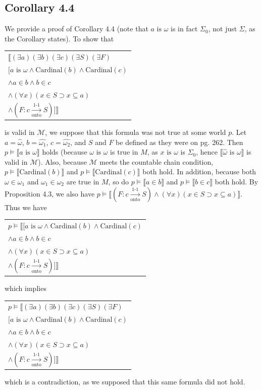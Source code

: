 \documentclass{article}
\newcommand{\lbc}{\llbracket}
\newcommand{\rbc}{\rrbracket}
\theoremstyle{definition}
\begin{document}
\subsection*{Corollary 4.4}
We provide a proof of Corollary 4.4 (note that $a\textrm{ is }\omega$ is in fact $\Sigma_0$, not just 
$\Sigma$, as the Corollary states). To show that 
\begin{center}
\begin{tabular}{l}
$\lbc(\exists a)(\exists b)(\exists c)(\exists S)(\exists F)$ \\
$[a\textrm{ is }\omega\wedge\textrm{Cardinal}(b)\wedge\textrm{Cardinal}(c)$ \\
$\wedge a\in b\wedge b\in c$ \\
$\wedge(\forall x)(x\in S\supset x\subseteq a)$ \\
$\wedge(F:c\xrightarrow[\textrm{onto}]{\text{1-1}} S)]\rbc$
\end{tabular}
\end{center}
is valid in $\mathcal{M}$, we suppose that this formula was not true at some world $p$. Let 
$a=\hat{\omega}$, $b=\widehat{\omega_1}$, $c=\widehat{\omega_2}$, and 
$S$ and $F$ be defined as they were on pg. 262. Then 
$p\vDash\lbc a\textrm{ is }\omega\rbc$ holds (because 
$\omega\textrm{ is }\omega$ is true in $M$, as $x\textrm{ is }\omega$ is $\Sigma_0$,
hence $\lbc\hat{\omega}\textrm{ is }\omega\rbc$ is 
valid in $\mathcal{M}$). Also, because $\mathcal{M}$ meets the countable chain condition, 
$p\vDash\lbc\textrm{Cardinal}(b)\rbc$ and $p\vDash\lbc\textrm{Cardinal}(c)\rbc$ both hold.
In addition, because both $\omega\in\omega_1$ and $\omega_1\in\omega_2$ are true in $M$, 
so do $p\vDash\lbc a\in b\rbc$ and $p\vDash\lbc b\in c\rbc$ both hold. By Proposition 4.3, we 
also have $p\vDash\lbc (F: c\xrightarrow[\textrm{onto}]{\text{1-1}}S)\wedge(\forall x)(x\in S\supset x\subseteq a)\rbc$. 
Thus we have
\begin{center}
\begin{tabular}{l}
$p\vDash\lbc[a\textrm{ is }\omega\wedge\textrm{Cardinal}(b)\wedge\textrm{Cardinal}(c)$ \\
$\wedge a\in b\wedge b\in c$ \\
$\wedge(\forall x)(x\in S\supset x\subseteq a)$ \\
$\wedge(F:c\xrightarrow[\textrm{onto}]{\text{1-1}} S)]\rbc$
\end{tabular}
\end{center}
which implies
\begin{center}
\begin{tabular}{l}
$p\vDash\lbc(\exists a)(\exists b)(\exists c)(\exists S)(\exists F)$ \\
$[a\textrm{ is }\omega\wedge\textrm{Cardinal}(b)\wedge\textrm{Cardinal}(c)$ \\
$\wedge a\in b\wedge b\in c$ \\
$\wedge(\forall x)(x\in S\supset x\subseteq a)$ \\
$\wedge(F:c\xrightarrow[\textrm{onto}]{\text{1-1}} S)]\rbc$
\end{tabular}
\end{center}
which is a contradiction, as we supposed that this same formula did not hold.
\end{document}
